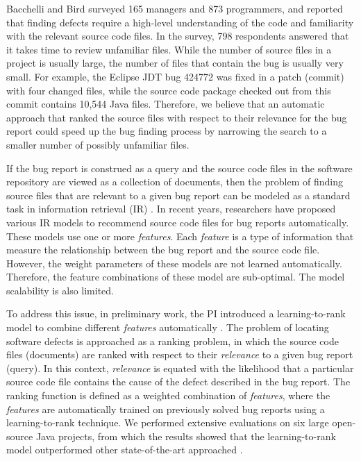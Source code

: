 Bacchelli and Bird \cite{Bacchelli:2013:EOC:2486788.2486882} surveyed 165 managers and 873 programmers, and reported that finding defects require a high-level understanding of the code and familiarity with the relevant source code files. In the survey, 798 respondents answered that it takes time to review unfamiliar files. While the number of source files in a project is usually large, the number of files that contain the bug is usually very small. For example, the Eclipse JDT bug 424772 was fixed in a patch (commit) with four changed files, while the source code package checked out from this commit contains 10,544 Java files. Therefore, we believe that an automatic approach that ranked the source files with respect to their relevance for the bug report could speed up the bug finding process by narrowing the search to a smaller number of possibly unfamiliar files.

If the bug report is construed as a query and the source code files in the software repository are viewed as a collection of documents, then the problem of finding source files that are relevant to a given bug report can be modeled as a standard task in information retrieval (IR) \cite{Manning:2008:IIR:1394399}. In recent years, researchers \cite{Kim:2013:WFT:2554428.2554437, Lukins:2010:BLU:1824820.1824850, Nguyen:2011:TAN:2190078.2190181, Rao:2011:RSL:1985441.1985451, Saha:2013:ASE:6693093, Wong:2014:ICSME, Zhou:2012:BFM:2337223.2337226} have proposed various IR models to recommend source code files for bug reports automatically. These models use one or more \textit{features}. Each \textit{feature} is a type of information that measure the relationship between the bug report and the source code file. However, the weight parameters of these models are not learned automatically. Therefore, the feature combinations of these model are sub-optimal. The model scalability is also limited.

To address this issue, in preliminary work, the PI introduced a learning-to-rank model to combine different \textit{features} automatically \cite{Ye:FSE14, Ye:TSE15}. The problem of locating software defects is approached as a ranking problem, in which the source code files (documents) are ranked with respect to their {\it relevance} to a given bug report (query). In this context, {\it relevance} is equated with the likelihood that a particular source code file contains the cause of the defect described in the bug report. The ranking function is defined as a weighted combination of \textit{features}, where the \textit{features} are automatically trained on previously solved bug reports using a learning-to-rank technique. We performed extensive evaluations on six large open-source Java projects, from which the results showed that the learning-to-rank model outperformed other state-of-the-art approached \cite{Ye:TSE15, Ye:Dissertation}.

